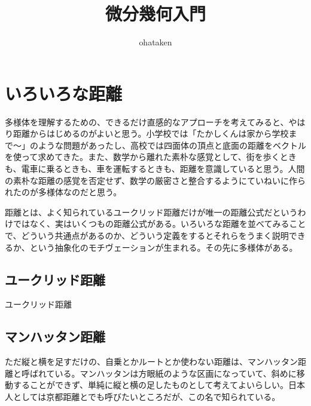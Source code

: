 \title{\huge 微分幾何入門}
\author{ohataken}
\maketitle

\newpage


\section{いろいろな距離}

多様体を理解するための、できるだけ直感的なアプローチを考えてみると、やはり距離からはじめるのがよいと思う。小学校では「たかしくんは家から学校まで〜」のような問題があったし、高校では四面体の頂点と底面の距離をベクトルを使って求めてきた。また、数学から離れた素朴な感覚として、街を歩くときも、電車に乗るときも、車を運転するときも、距離を意識していると思う。人間の素朴な距離の感覚を否定せず、数学の厳密さと整合するようにていねいに作られたのが多様体なのだと思う。

距離とは、よく知られているユークリッド距離だけが唯一の距離公式だというわけではなく、実はいくつもの距離公式がある。いろいろな距離を並べてみることで、どういう共通点があるのか、どういう定義をするとそれらをうまく説明できるか、という抽象化のモチヴェーションが生まれる。その先に多様体がある。

\newpage


\subsection{ユークリッド距離}

ユークリッド距離

\newpage


\subsection{マンハッタン距離}

ただ縦と横を足すだけの、自乗とかルートとか使わない距離は、マンハッタン距離と呼ばれている。マンハッタンは方眼紙のような区画になっていて、斜めに移動することができず、単純に縦と横の足したものとして考えてよいらしい。日本人としては京都距離とでも呼びたいところだが、この名で知られている。

